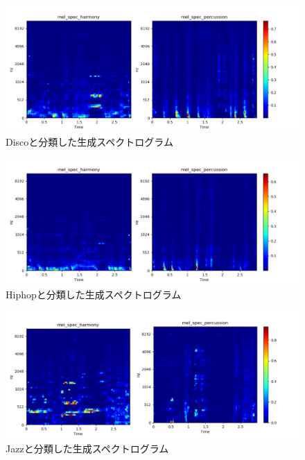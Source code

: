 \begin{figure}[htbp]
	\begin{center}
		\includegraphics[scale=0.51]{./images/generate-model/gen-disco.png}
		\caption{Discoと分類した生成スペクトログラム}
		\label{fig:generate-disco}
	\end{center}
\end{figure}
\begin{figure}[htbp]
	\begin{center}
		\includegraphics[scale=0.51]{./images/generate-model/gen-hiphop.png}
		\caption{Hiphopと分類した生成スペクトログラム}
		\label{fig:generate-hiphop}
	\end{center}
\end{figure}
\begin{figure}[htbp]
	\begin{center}
		\includegraphics[scale=0.51]{./images/generate-model/gen-jazz.png}
		\caption{Jazzと分類した生成スペクトログラム}
		\label{fig:generate-jazz}
	\end{center}
\end{figure}
